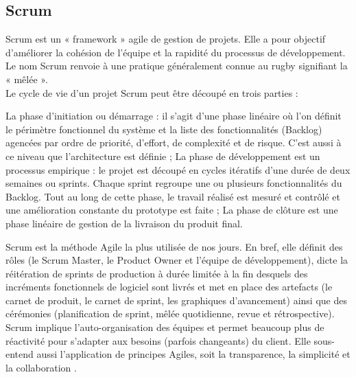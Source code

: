 \subsection{Scrum}
Scrum est un « framework » \cite{sg} agile de gestion de projets. Elle a pour objectif d’améliorer la cohésion de l’équipe et la rapidité du processus de développement. Le nom Scrum renvoie à une pratique généralement connue au rugby signifiant la « mêlée ».\\
Le cycle de vie d’un projet Scrum peut être découpé en trois parties :
\begin{itemize}
	\itemcheck La phase d’initiation ou démarrage : il s’agit d’une phase linéaire où l’on
	définit le périmètre fonctionnel du système et la liste des fonctionnalités
	(Backlog) agencées par ordre de priorité, d’effort, de complexité et de risque.
	C’est aussi à ce niveau que l’architecture est définie ;
	\itemcheck La phase de développement est un processus empirique : le projet est découpé
	en cycles itératifs d’une durée de deux semaines ou sprints. Chaque sprint
	regroupe une ou plusieurs fonctionnalités du Backlog. Tout au long de cette
	phase, le travail réalisé est mesuré et contrôlé et une amélioration constante du
	prototype est faite ;
	\itemcheck La phase de clôture est une phase linéaire de gestion de la livraison du produit
	final.
\end{itemize}
Scrum est la méthode Agile la plus utilisée de nos jours. En bref, elle définit des rôles (le Scrum Master, le Product Owner et l’équipe de développement), dicte la réitération de sprints de production à durée limitée à la fin desquels des incréments fonctionnels de logiciel sont livrés et met en place des artefacts (le carnet de produit, le carnet de sprint, les graphiques d’avancement) ainsi que des cérémonies (planification de sprint, mêlée quotidienne, revue et rétrospective).
Scrum implique l’auto-organisation des équipes et permet beaucoup plus de réactivité pour s’adapter aux besoins (parfois changeants) du client. Elle sous-entend aussi l’application de principes Agiles, soit la transparence, la simplicité et la collaboration \cite{scrum}.\\
